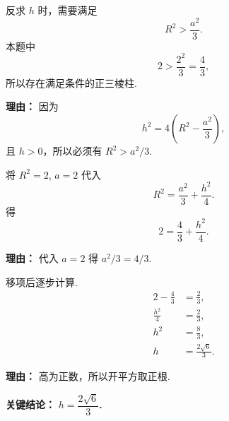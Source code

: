 \begin{examplebox}
\begin{description}[style=nextline, leftmargin=2.8em, labelsep=0.5em, itemsep=0.45em]
		\item[\textbf{第二步（存在性检查）：}] 反求 $h$ 时，需要满足
		      \[
			      R^{2}>\frac{a^{2}}{3}.
		      \]
		      本题中
		      \[
			      2>\frac{2^{2}}{3}=\frac43,
		      \]
		      所以存在满足条件的正三棱柱.
		      \par\textbf{理由：} 因为
		      \[
			      h^{2}=4\left(R^{2}-\frac{a^{2}}{3}\right),
		      \]
		      且 $h>0$，所以必须有 $R^{2}>a^{2}/3$.

		\item[\textbf{第三步（代入外接球公式）：}] 将 $R^{2}=2$, $a=2$ 代入
		      \[
			      R^{2} = \frac{a^{2}}{3} + \frac{h^{2}}{4}.
		      \]
		      得
		      \[
			      2 = \frac{4}{3} + \frac{h^{2}}{4}.
		      \]
		      \par\textbf{理由：} 代入 $a=2$ 得 $a^{2}/3=4/3$.

		\item[\textbf{第四步（解高 $h$）：}] 移项后逐步计算.
		      \[
			      \begin{aligned}
				      2 - \frac{4}{3} & = \frac{2}{3},         \\
				      \frac{h^{2}}{4} & = \frac{2}{3},         \\
				      h^{2}           & = \frac{8}{3},         \\
				      h               & = \frac{2\sqrt{6}}{3}.
			      \end{aligned}
		      \]
		      \par\textbf{理由：} 高为正数，所以开平方取正根.
	\end{description}

	\textbf{\textcolor{CExample}{关键结论：}} \textbf{$h = \dfrac{2\sqrt{6}}{3}$.}
\end{examplebox}